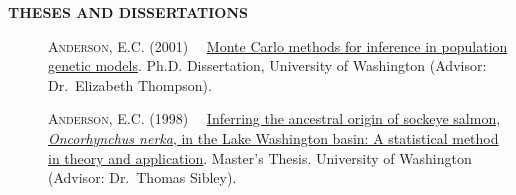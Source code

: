 \documentclass[11pt]{article}
\newlength{\postskip}
\begin{document}
\nocite{*}


\printbibliography[type=article, heading=article]
\printbibliography[type=inbook, heading=inbook]
\printbibliography[type=report, heading=report]
\printbibliography[type=inproceedings, heading=inproceedings]






\vspace*{\postskip}
{\bf THESES AND DISSERTATIONS}
\begin{description}
\item[] \textsc{Anderson, E.C.} (2001) \ \ \href{http://ib.berkeley.edu/labs/slatkin/eriq/writings/ECA_Dissertation.pdf}{Monte Carlo methods for inference
in population genetic models}.  Ph.D. Dissertation, University of Washington
(Advisor: Dr.~Elizabeth Thompson).
\item[] \textsc{Anderson, E.C.} (1998) \ \ \href{http://ib.berkeley.edu/labs/slatkin/eriq/writings/eric_anderson_ms_thesis.pdf}{Inferring the ancestral origin of 
sockeye salmon, {\em Oncorhynchus nerka}, in the Lake Washington basin:
A statistical method in theory and application}. Master's Thesis. University of Washington
(Advisor: Dr.\ Thomas Sibley).
\end{description}
\end{document}
